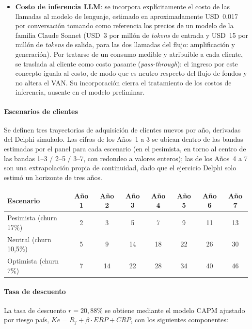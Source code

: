 \begin{itemize}
    \item \textbf{Costo de inferencia LLM}: se incorpora explícitamente el costo de las llamadas al modelo de lenguaje, estimado en aproximadamente USD~0,017 por conversación tomando como referencia los precios de un modelo de la familia Claude Sonnet (USD~3 por millón de \textit{tokens} de entrada y USD~15 por millón de \textit{tokens} de salida, para las dos llamadas del flujo: amplificación y generación). Por tratarse de un consumo medible y atribuible a cada cliente, se traslada al cliente como costo pasante (\textit{pass-through}): el ingreso por este concepto iguala al costo, de modo que es neutro respecto del flujo de fondos y no altera el VAN. Su incorporación cierra el tratamiento de los costos de inferencia, ausente en el modelo preliminar.
\end{itemize}

\paragraph{Escenarios de clientes}
Se definen tres trayectorias de adquisición de clientes nuevos por año, derivadas del Delphi simulado. Las cifras de los Años~1 a 3 se ubican dentro de las bandas estimadas por el panel para cada escenario (en el pesimista, en torno al centro de las bandas 1--3 / 2--5 / 3--7, con redondeo a valores enteros); las de los Años~4 a 7 son una extrapolación propia de continuidad, dado que el ejercicio Delphi solo estimó un horizonte de tres años.

\begin{center}
\label{tab:trayectorias-clientes}
\footnotesize
\begin{tabular}{lccccccc}
\toprule
\textbf{Escenario} & \textbf{Año 1} & \textbf{Año 2} & \textbf{Año 3} & \textbf{Año 4} & \textbf{Año 5} & \textbf{Año 6} & \textbf{Año 7} \\
\midrule
Pesimista (churn 17\%) & 2 & 3 & 5 & 7 & 9 & 11 & 13 \\
Neutral (churn 10,5\%) & 5 & 9 & 14 & 18 & 22 & 26 & 30 \\
Optimista (churn 7\%) & 7 & 14 & 22 & 28 & 34 & 40 & 46 \\
\bottomrule
\end{tabular}
\end{center}

\paragraph{Tasa de descuento}
La tasa de descuento $r = 20{,}88\%$ se obtiene mediante el modelo CAPM ajustado por riesgo país, $Ke = R_f + \beta\cdot ERP + CRP$, con los siguientes componentes:

